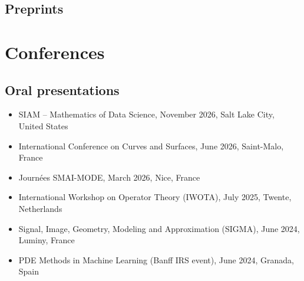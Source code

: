 \documentclass[11pt,a4paper,sans]{moderncv}
\begin{document}
\subsection{Preprints}
\printbibliography[keyword={preprint}, heading=none]



	
	
	
	

\section{Conferences}

\subsection{Oral presentations}

\begin{itemize}
	\item SIAM -- Mathematics of Data Science, November 2026, Salt Lake City, United States
	\item International Conference on Curves and Surfaces, June 2026, Saint-Malo, France
	\item Journées SMAI-MODE, March 2026, Nice, France
	\item International Workshop on Operator Theory (IWOTA), July 2025, Twente, Netherlands
	\item Signal, Image, Geometry, Modeling and Approximation (SIGMA), June 2024, Luminy, France
	\item PDE Methods in Machine Learning (Banff IRS event), June 2024, Granada, Spain
\end{itemize}
\end{document}
